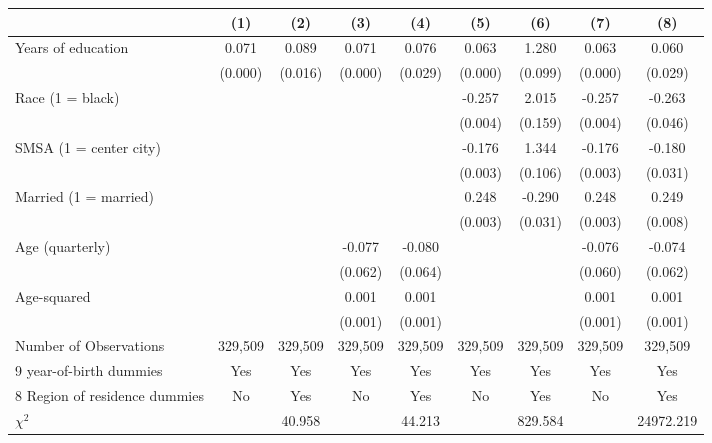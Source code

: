 {
\def\sym#1{\ifmmode^{#1}\else\(^{#1}\)\fi}
\begin{tabular}{l*{8}{c}}
\hline\hline
                    &\multicolumn{1}{c}{(1)}&\multicolumn{1}{c}{(2)}&\multicolumn{1}{c}{(3)}&\multicolumn{1}{c}{(4)}&\multicolumn{1}{c}{(5)}&\multicolumn{1}{c}{(6)}&\multicolumn{1}{c}{(7)}&\multicolumn{1}{c}{(8)}\\
\hline
Years of education  &       0.071&       0.089&       0.071&       0.076&       0.063&       1.280&       0.063&       0.060\\
                    &     (0.000)&     (0.016)&     (0.000)&     (0.029)&     (0.000)&     (0.099)&     (0.000)&     (0.029)\\
Race (1 = black)    &            &            &            &            &      -0.257&       2.015&      -0.257&      -0.263\\
                    &            &            &            &            &     (0.004)&     (0.159)&     (0.004)&     (0.046)\\
SMSA (1 = center city)&            &            &            &            &      -0.176&       1.344&      -0.176&      -0.180\\
                    &            &            &            &            &     (0.003)&     (0.106)&     (0.003)&     (0.031)\\
Married (1 = married)&            &            &            &            &       0.248&      -0.290&       0.248&       0.249\\
                    &            &            &            &            &     (0.003)&     (0.031)&     (0.003)&     (0.008)\\
Age (quarterly)     &            &            &      -0.077&      -0.080&            &            &      -0.076&      -0.074\\
                    &            &            &     (0.062)&     (0.064)&            &            &     (0.060)&     (0.062)\\
Age-squared         &            &            &       0.001&       0.001&            &            &       0.001&       0.001\\
                    &            &            &     (0.001)&     (0.001)&            &            &     (0.001)&     (0.001)\\
\hline
Number of Observations&     329,509&     329,509&     329,509&     329,509&     329,509&     329,509&     329,509&     329,509\\
9 year-of-birth dummies&         Yes&         Yes&         Yes&         Yes&         Yes&         Yes&         Yes&         Yes\\
8 Region of residence dummies&          No&         Yes&          No&         Yes&          No&         Yes&          No&         Yes\\
$\chi^2$            &            &      40.958&            &      44.213&            &     829.584&            &   24972.219\\
\hline\hline
\end{tabular}
}
